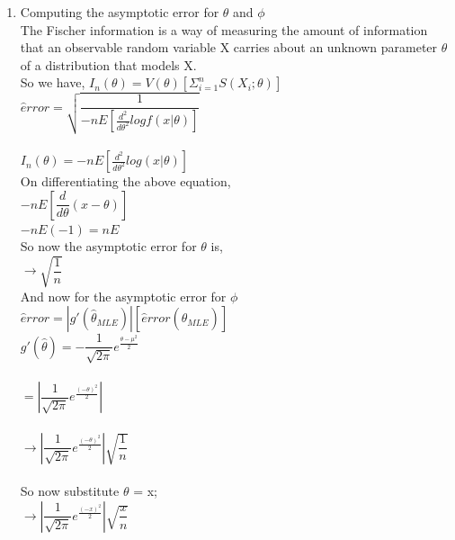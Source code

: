 \documentclass[11pt]{article}
\begin{document}
\begin{enumerate}
\begin{enumerate}
\item Computing the asymptotic error for $\theta$ and $\phi$\\

The Fischer information is a way of measuring the amount of information that an observable random variable X carries about an unknown parameter $\theta$ of a distribution that models X. \\

So we have, $I_{n}(\theta) = V(\theta) [\Sigma_{i=1}^{n} S(X_{i};\theta)]$\\

$\hat error = \sqrt{\dfrac{1}{-nE[\frac{d^2}{d\theta^2} log f (x|\theta)]}} $\\\\

$I_{n}(\theta) = -nE[\frac{d^2}{d\theta^2} log  (x|\theta)]$\\

On differentiating the above equation,\\

$ -nE[\dfrac{d}{d\theta}(x- \theta)]$\\

$-nE(-1) = nE $\\

So now the asymptotic error for $\theta$ is,\\

$ \rightarrow \sqrt{\dfrac{1}{n} }$\\

And now for the asymptotic error for $\phi$ \\

$\hat error = \left |g \prime (\hat \theta_{MLE})\right| [ \hat error(\hat \theta_{MLE})]$\\

$ g \prime (\hat \theta) = -\dfrac{1}{\sqrt{2\pi}} e^{\frac{{\theta - \mu}^2}{2}}$\\\\

$= \left| \dfrac{1}{\sqrt{2\pi}} e^{\frac{{(-\theta)}^2}{2}} \right |$\\\\

$ \rightarrow \left| \dfrac{1}{\sqrt{2\pi}} e^{\frac{{(-\theta)}^2}{2}}\right | \sqrt{\dfrac{1}{n}}$\\\\

So now substitute $\theta$ = x;\\

$ \rightarrow \left | \dfrac{1}{\sqrt{2\pi}} e^{\frac{{(-x)}^2}{2}}\right | \sqrt{\dfrac{x}{n}}$\\\\








\end{enumerate}
\end{enumerate}
\end{document}
